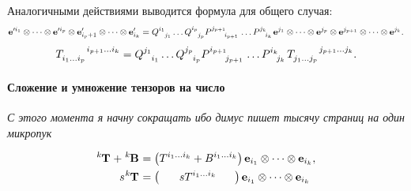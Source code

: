 \begin{theorem}
	Аналогичными действиями выводится формула для общего случая:
	\begin{equation*}
		\mathbf{e}'^{i_1}\otimes\dots\otimes\mathbf{e}'^{i_p}\otimes\mathbf{e}'_{i_p+1}\otimes\dots\otimes\mathbf{e}'_{i_k} = 
		\tensor{Q}{^{i_1}_{j_1}}\dots\tensor{Q}{^{i_p}_{j_p}}\tensor{P}{^{j_{p+1}}_{i_{p+1}}}\dots\tensor{P}{^{j_k}_{i_k}}\mathbf{e}^{j_1}\otimes\dots\otimes\mathbf{e}^{j_p}\otimes\mathbf{e}^{j_{p+1}}\otimes\dots\otimes\mathbf{e}^{j_k}.
	\end{equation*}
	\begin{equation*}
\tensor{T}{_{i_1\dots i_p}^{i_{p+1}\dots i_k}} = \tensor{Q}{^{j_1}_{i_1}}\dots\tensor{Q}{^{j_p}_{i_p}}\tensor{P}{^{i_{p+1}}_{j_{p+1}}}\dots\tensor{P}{^{i_k}_{j_k}}\tensor{T}{_{j_1\dots j_p}^{j_{p+1}\dots j_k}}.
	\end{equation*}
\end{theorem}

\paragraph{Сложение и умножение тензоров на число}
\textit{С этого момента я начну сокращать ибо димус пишет тысячу страниц на один микропук}

\begin{align*}
	\tensor[^k]{\mathbf{T}}{} + \tensor[^k]{\mathbf{B}}{} &= \left(
	\tensor{T}{^{{i_1}\dots{i_k}}} + \tensor{B}{^{{i_1}\dots{i_k}}}
	\right) \mathbf{e}_{i_1}\otimes\dots\otimes \mathbf{e}_{i_k},\\
	s\tensor[^k]{\mathbf{T}}{} &= \left(\phantom{ttttt}s\tensor{T}{^{{i_1}\dots{i_k}}}\:\phantom{tttt}\right)\mathbf{e}_{i_1}\otimes\dots\otimes \mathbf{e}_{i_k}
\end{align*}

